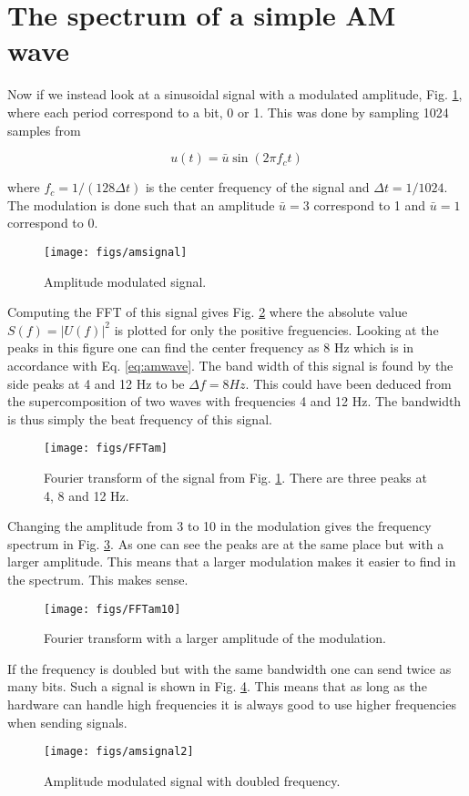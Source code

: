 \section{The spectrum of a simple AM wave}

Now if we instead look at a sinusoidal signal with a modulated amplitude, Fig. \ref{fig:amsignal}, where each period correspond to a bit, 0 or 1. This was done by sampling 1024 samples from

\begin{equation}
\label{eq:amwave}
  u(t) = \bar{u}\sin{(2\pi f_c t)}
\end{equation}

where $f_c = 1/(128\Delta t)$ is the center frequency of the signal and $\Delta t = 1/1024$. The modulation is done such that an amplitude $\bar{u} = 3$ correspond to 1 and $\bar{u} = 1$ correspond to 0.

\begin{figure}[h]
  \centering
  \texttt{[image: figs/amsignal]}
  \caption{Amplitude modulated signal.}
  \label{fig:amsignal}
\end{figure}

Computing the FFT of this signal gives Fig. \ref{fig:FFTam} where the absolute value $S(f) = |U(f)|^2$ is plotted for only the positive freguencies. Looking at the peaks in this figure one can find the center frequency as 8 Hz which is in accordance with Eq. \eqref{eq:amwave}. The band width of this signal is found by the side peaks at 4 and 12 Hz to be $\Delta f = 8 Hz$. This could have been deduced from the supercomposition of two waves with frequencies 4 and 12 Hz. The bandwidth is thus simply the beat frequency of this signal.

\begin{figure}[h]
  \centering
  \texttt{[image: figs/FFTam]}
  \caption{Fourier transform of the signal from Fig. \ref{fig:amsignal}. There are three peaks at 4, 8 and 12 Hz.}
  \label{fig:FFTam}
\end{figure}

Changing the amplitude from 3 to 10 in the modulation gives the frequency spectrum in Fig. \ref{fig:FFTam10}. As one can see the peaks are at the same place but with a larger amplitude. This means that a larger modulation makes it easier to find in the spectrum. This makes sense.

\begin{figure}[h]
  \centering
  \texttt{[image: figs/FFTam10]}
  \caption{Fourier transform with a larger amplitude of the modulation.}
  \label{fig:FFTam10}
\end{figure}

If the frequency is doubled but with the same bandwidth one can send twice as many bits. Such a signal is shown in Fig. \ref{fig:amsignal2}. This means that as long as the hardware can handle high frequencies it is always good to use higher frequencies when sending signals.

\begin{figure}[h]
  \centering
  \texttt{[image: figs/amsignal2]}
  \caption{Amplitude modulated signal with doubled frequency.}
  \label{fig:amsignal2}
\end{figure}
\clearpage
